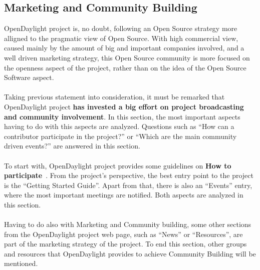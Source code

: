 \documentclass[a4paper, 12pt]{book}
\begin{document}
\subsection{Marketing and Community Building}
OpenDaylight project is, no doubt, following an Open Source strategy more alligned to the pragmatic view of Open Source. With high commercial view, caused mainly by the amount of big and important companies involved, and a well driven marketing strategy, this Open Source community is more focused on the openness aspect of the project, rather than on the idea of the Open Source Software aspect.\\
\\
Taking previous statement into consideration, it must be remarked that OpenDaylight project \textbf{has invested a big effort on project broadcasting and community involvement}. In this section, the most important aspects having to do with this aspects are analyzed. Questions such as ``How can a contributor participate in the project?'' or ``Which are the main community driven events?'' are answered in this section.\\
\\
To start with, OpenDaylight project provides some guidelines on \textbf{How to participate}~\cite{OpenDaylightHowToParticipate}. From the project's perspective, the best entry point to the project is the ``Getting Started Guide''. Apart from that, there is also an ``Events'' entry, where the most important meetings are notified. Both aspects are analyzed in this section.\\
\\
Having to do also with Marketing and Community building, some other sections from the OpenDaylight project web page, such as ``News'' or ``Resources'', are part of the marketing strategy of the project. To end this section, other groups and resources that OpenDaylight provides to achieve Community Building will be mentioned.
\end{document}
